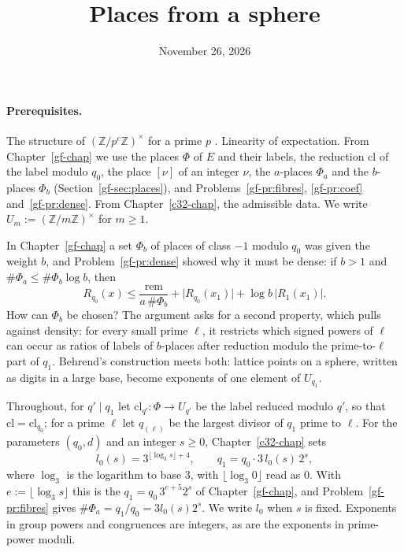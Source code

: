 \documentclass[reqno]{amsart}
\title{Places from a sphere}
\author{}
\date{November 26, 2026}
\newcounter{chap}
\theoremstyle{definition}
\theoremstyle{plain}
\newcommand{\Z}{\mathbb{Z}}
\begin{document}
\maketitle
{}\label{chap}

\paragraph{Prerequisites.}
The structure of \((\Z/p^c\Z)^\times\) for a prime \(p\) \cite[Ch.~4, \S1]{IR}.  Linearity of expectation.  From Chapter~\ref{gf-chap} we use the places \(\Phi\) of \(E\) and their labels, the reduction \(\mathrm{cl}\) of the label modulo \(q_0\), the place \([\nu]\) of an integer \(\nu\), the \(a\)-places \(\Phi_a\) and the \(b\)-places \(\Phi_b\) (Section~\ref{gf-sec:places}), and Problems~\ref{gf-pr:fibres}, \ref{gf-pr:coef} and~\ref{gf-pr:dense}.  From Chapter~\ref{c32-chap}, the admissible data.  We write \(U_m := (\Z/m\Z)^\times\) for \(m \ge 1\).

\medskip
In Chapter~\ref{gf-chap} a set \(\Phi_b\) of places of class \(-1\) modulo \(q_0\) was given the weight \(b\), and Problem~\ref{gf-pr:dense} showed why it must be dense: if \(b > 1\) and \(\#\Phi_a \le \#\Phi_b\log b\), then
\[
  R_{q_0}(x) \le \frac{\mathrm{rem}}{a\,\#\Phi_b} + \lvert R_{q_0}(x_1)\rvert + \log b\,\lvert R_1(x_1)\rvert .
\]
How can \(\Phi_b\) be chosen?  The argument asks for a second property, which pulls against density: for every small prime \(\ell\), it restricts which signed powers of \(\ell\) can occur as ratios of labels of \(b\)-places after reduction modulo the prime-to-\(\ell\) part of \(q_1\).  Behrend's construction \cite{Beh} meets both: lattice points on a sphere, written as digits in a large base, become exponents of one element of \(U_{q_1}\).

Throughout, for \(q' \mid q_1\) let \(\mathrm{cl}_{q'} \colon \Phi \to U_{q'}\) be the label reduced modulo \(q'\), so that \(\mathrm{cl} = \mathrm{cl}_{q_0}\); for a prime \(\ell\) let \(q_{(\ell)}\) be the largest divisor of \(q_1\) prime to \(\ell\).  For the parameters \((q_0, d)\) and an integer \(s \ge 0\), Chapter~\ref{c32-chap} sets
\[
  l_0(s) = 3^{\lfloor \log_3 s\rfloor + 4}, \qquad q_1 = q_0 \cdot 3\,l_0(s)\,2^s ,
\]
where \(\log_3\) is the logarithm to base \(3\), with \(\lfloor\log_3 0\rfloor\) read as \(0\).  With \(e := \lfloor\log_3 s\rfloor\) this is the \(q_1 = q_0\,3^{e+5}2^s\) of Chapter~\ref{gf-chap}, and Problem~\ref{gf-pr:fibres} gives \(\#\Phi_a = q_1/q_0 = 3l_0(s)2^s\).  We write \(l_0\) when \(s\) is fixed.  Exponents in group powers and congruences are integers, as are the exponents in prime-power moduli.
\end{document}
